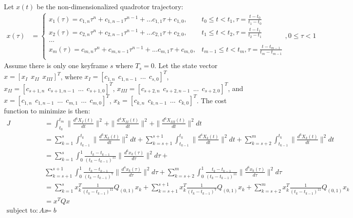 \documentclass[11pt]{article}
\begin{document}
\mbox{}\newline
Let $x(t)$ be the non-dimensionalized quadrotor trajectory:
\begin{align*}
x(\tau) &= 
\begin{cases}
    x_1 (\tau) = c_{1, n} \tau^n + c_{1, n-1} \tau^{n-1} + ... c_{1, 1} \tau + c_{1, 0}, & t_0 \le t < t_1, \tau = \frac{t-t_0}{t_1-t_0}  \\
    x_2 (\tau) = c_{2, n} \tau^n + c_{2, n-1} \tau^{n-1} + ... c_{2, 1} \tau + c_{2, 0}, & t_1 \le t < t_2, \tau = \frac{t-t_1}{t_2-t_1}  \\
    ... \\
    x_m (\tau) = c_{m, n} \tau^n + c_{m, n-1} \tau^{n-1} + ... c_{m, 1} \tau + c_{m, 0}, & t_{m-1} \le t < t_m, \tau = \frac{t-t_{m-1}}{t_m-t_{m-1}} \\
\end{cases},  0 \le \tau < 1
\end{align*} 
Assume there is only one keyframe $s$ where $T_s = 0$. Let the state vector $x = [x_I \ \ x_{II} \ \ x_{III}]^T$, where $x_I = [c_{1, n} \ \ c_{1, n-1} \ \ ... \ \ c_{s, 0} ]^T$, $x_{II} = [c_{s+1, n} \ \ c_{s+1, n-1} \ \ ... \ \ c_{s+1, 0}]^T$, $x_{III} = [c_{s+2, n} \ \ c_{s+2, n-1} \ \ ... \ \ c_{s+2, 0} ]^T$, and $x = [c_{1, n} \ \ c_{1, n-1} \ \ ... \ \ c_{m, 1} \ \ ... \ \ c_{m, 0} ]^T$, $x_k = [c_{k, n} \ \ c_{k, n-1} \ \ ... \ \ c_{k, 0} ]^T$. The cost function to minimize is then:
\begin{align*}
J &= \int_{t_0}^{t_m} \|  \frac{d^{6} X_I(t) }{dt} \|^2 + \|  \frac{d^{4} X_{II}(t) }{dt} \|^2 + \|  \frac{d^{6} X_{III}(t) }{dt} \|^2 dt \\
&= \sum_{k=1}^{s} \int_{t_{k-1}}^{t_k} \|  \frac{d^{6} X_k (t) }{dt} \|^2 dt +\sum_{k=s+1}^{s+1} \int_{t_{k-1}}^{t_k} \|  \frac{d^{4} X_k (t) }{dt} \|^2 dt +\sum_{k=s+2}^{m} \int_{t_{k-1}}^{t_k} \|  \frac{d^{6} X_k (t) }{dt} \|^2 dt  \\
&= \sum_{k=1}^{s} \int_{0}^{1} \frac{t_k-t_{k-1}}{(t_k-t_{k-1})^{11}} \|  \frac{d^{6} x_k (\tau) }{d\tau} \|^2 d\tau + \\
&  \sum_{k=s+1}^{s+1} \int_{0}^{1} \frac{t_k-t_{k-1}}{(t_k-t_{k-1})^{7}} \|  \frac{d^{4} x_k (\tau) }{d\tau} \|^2 d\tau + \sum_{k=s+2}^{m} \int_{0}^{1} \frac{t_k-t_{k-1}}{(t_k-t_{k-1})^{11}} \|  \frac{d^{6} x_k (\tau) }{d\tau} \|^2 d\tau  \\
&=  \sum_{k=1}^{s} x_k^T \frac{1}{(t_k-t_{k-1})^{11}} Q_{(0, 1)} x_k + \sum_{k=s+1}^{s+1} x_k^T \frac{1}{(t_k-t_{k-1})^{7}} Q_{(0, 1)} x_k  + \sum_{k=s+2}^{m} x_k^T \frac{1}{(t_k-t_{k-1})^{11}} Q_{(0, 1)} x_k \\
&= x^T Q x \\
\text{subject to: } A x &=b
\end{align*}
\end{document}
